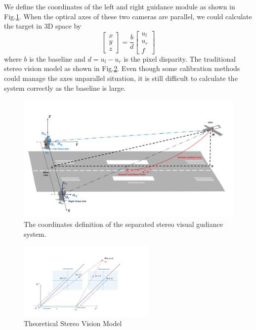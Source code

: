 We define the coordinates of the left and right guidance module as shown in Fig.\ref{fig:Fig04_GeneralSystem}. When the optical axes of these two cameras are parallel, we could calculate the target in 3D space by
\begin{equation}
	\left[ {\begin{array}{*{20}{c}}
			x \\ 
			y \\ 
			z 
	\end{array}} \right] =\frac{b}{d} \left[ {\begin{array}{*{20}{c}}
			u_l \\ 
			u_r \\ 
			f 
	\end{array}} \right]
\end{equation}
where $b$ is the baseline and $d=u_l-u_r$ is the pixel disparity. The traditional stereo vision model as shown in Fig.\ref{fig:chp03_vision_20_basic_stereo}. Even though some calibration methods could manage the axes unparallel situation, it is still difficult to calculate the system correctly as the baseline is large.
\begin{figure}[!hb]
	\centering
	\includegraphics[width=\textwidth]{Figs/Fig04_GeneralSystem.pdf}
	\caption{The coordinates definition of the separated stereo visual gudiance system.}
	\label{fig:Fig04_GeneralSystem}
\end{figure}

\begin{figure}[!tb]
	\centering
	\includegraphics[width=0.6\textwidth]{figs/chp03_vision_20_basic_stereo.pdf}	
	\caption{Theoretical Stereo Vision Model}
	\label{fig:chp03_vision_20_basic_stereo}
\end{figure}

